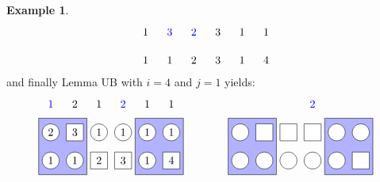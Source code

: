 \documentclass[reqno]{amsart}
\newcommand{\0}{\phantom{c}}
\theoremstyle{plain}
\theoremstyle{definition}
\newtheorem{example}[thm]{Example}
\numberwithin{equation}{section}
\begin{document}
\begin{example}
\[\begin{tikzpicture}[scale=0.9]
  \node[blue] at (2*\sc,\ll) {$3$};
  \node[blue] at (3*\sc,\ll) {$2$};
  \foreach \i in {1,5,6} { \node at (\i*\sc,\ll) {$1$}; }
  \foreach \i in {4} { \node at (\i*\sc,\ll) {$3$}; }
  \foreach \i in {1,2,5} { \node at (\i*\sc,\l) {$1$}; }
  \foreach \i in {3} { \node at (\i*\sc,\l) {$2$}; }
  \foreach \i in {4} { \node at (\i*\sc,\l) {$3$}; }
  \foreach \i in {6} { \node at (\i*\sc,\l) {$4$}; }
\end{tikzpicture}
\]
and finally Lemma UB with $i=4$ and $j=1$ yields:
\[
\begin{tikzpicture}[scale=0.9]
  \def\sc{0.85}   %
  \def\lll{3}  %
  \def\ll{2}   %
  \def\l{1}   %
  \draw[fill=blue!30] (0.5*\sc,\l-.5) rectangle(2.5*\sc,\ll+.5);
  \draw[fill=blue!30] (4.5*\sc,\l-.5) rectangle(6.5*\sc,\ll+.5);
  \foreach \i in {1,3,4,5,6} { \draw[fill=white] (\i*\sc,\ll) circle (0.3); }
  \foreach \i in {2} { \draw[fill=white] (\i*\sc-.3,\ll-.3) rectangle +(0.6,+0.6); }
  \foreach \i in {1,2,5} { \draw[fill=white] (\i*\sc,\l) circle (0.3); }
  \foreach \i in {3,4,6} { \draw[fill=white] (\i*\sc-.3,\l-.3) rectangle +(0.6,+0.6); }
  \node[blue] at (4*\sc,\lll) {$2$};
  \node[blue] at (1*\sc,\lll) {$1$};
  \foreach \i in {3,5,6} { \node at (\i*\sc,\lll) {$1$}; }
  \foreach \i in {2} { \node at (\i*\sc,\lll) {$2$}; }
  \foreach \i in {3,4,5,6} { \node at (\i*\sc,\ll) {$1$}; }
  \foreach \i in {1} { \node at (\i*\sc,\ll) {$2$}; }
  \foreach \i in {2} { \node at (\i*\sc,\ll) {$3$}; }
  \foreach \i in {1,2,5} { \node at (\i*\sc,\l) {$1$}; }
  \foreach \i in {3} { \node at (\i*\sc,\l) {$2$}; }
  \foreach \i in {4} { \node at (\i*\sc,\l) {$3$}; }
  \foreach \i in {6} { \node at (\i*\sc,\l) {$4$}; }
\end{tikzpicture}
\hspace{40pt}
\begin{tikzpicture}[scale=0.9]
  \def\sc{0.85}   %
  \def\lll{3}  %
  \def\ll{2}   %
  \def\l{1}   %
  \draw[fill=blue!30] (0.5*\sc,\l-.5) rectangle(2.5*\sc,\ll+.5);
  \draw[fill=blue!30] (4.5*\sc,\l-.5) rectangle(6.5*\sc,\ll+.5);
  \foreach \i in {1,5,6} { \draw[fill=white] (\i*\sc,\ll) circle (0.3); }
  \foreach \i in {2,3,4} { \draw[fill=white] (\i*\sc-.3,\ll-.3) rectangle +(0.6,+0.6); }
  \foreach \i in {1,2,3,4,5} { \draw[fill=white] (\i*\sc,\l) circle (0.3); }
  \foreach \i in {6} { \draw[fill=white] (\i*\sc-.3,\l-.3) rectangle +(0.6,+0.6); }
  \node[blue] at (4*\sc,\lll) {$2$};

\end{tikzpicture}\]
\end{example}
\end{document}
